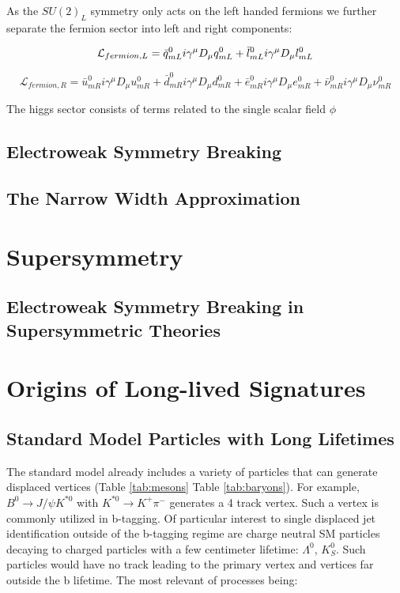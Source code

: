As the $SU(2)_L$ symmetry only acts on the left handed fermions we further separate the fermion sector into left and right components:

\begin{equation}
\mathcal{L}_{fermion,L} = \bar{q}^0_{mL} i \gamma^\mu D_\mu q^0_{mL} + \bar{l}^0_{mL} i \gamma^\mu D_\mu l^0_{mL}  \\
\end{equation}

\begin{equation}
\mathcal{L}_{fermion,R} =  \bar{u}^0_{mR} i \gamma^\mu D_\mu u^0_{mR} 
+ \bar{d}^0_{mR} i \gamma^\mu D_\mu d^0_{mR} + \bar{e}^0_{mR} i \gamma^\mu D_\mu e^0_{mR} + \bar{\nu}^0_{mR} i \gamma^\mu D_\mu \nu^0_{mR}
\end{equation}

The higgs sector consists of terms related to the single scalar field $\phi$

\subsection{Electroweak Symmetry Breaking}

\subsection{The Narrow Width Approximation}

\section{Supersymmetry}

\subsection{Electroweak Symmetry Breaking in Supersymmetric Theories}


\section{Origins of Long-lived Signatures}

\subsection{Standard Model Particles with Long Lifetimes}

The standard model already includes a variety of particles that can generate displaced vertices (Table \ref{tab:mesons} Table \ref{tab:baryons}). 
For example, $B^0 \rightarrow J/\psi K^{*0}$ with $K^{*0} \rightarrow K^+\pi^-$ generates a 4 track vertex. Such a vertex is commonly utilized 
in b-tagging. Of particular interest to single displaced jet identification outside of the b-tagging regime are charge neutral SM particles
decaying to charged particles with a few centimeter lifetime: $\Lambda^0$, $K_S^0$. Such particles would have no track
leading to the primary vertex and vertices far outside the b lifetime. The most relevant of processes being:

